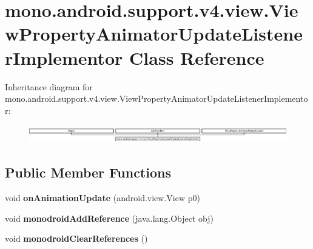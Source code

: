 \hypertarget{classmono_1_1android_1_1support_1_1v4_1_1view_1_1_view_property_animator_update_listener_implementor}{}\section{mono.\+android.\+support.\+v4.\+view.\+View\+Property\+Animator\+Update\+Listener\+Implementor Class Reference}
\label{classmono_1_1android_1_1support_1_1v4_1_1view_1_1_view_property_animator_update_listener_implementor}
Inheritance diagram for mono.\+android.\+support.\+v4.\+view.\+View\+Property\+Animator\+Update\+Listener\+Implementor\+:\begin{figure}[H]
\begin{center}
\leavevmode
\includegraphics[height=0.789288cm]{classmono_1_1android_1_1support_1_1v4_1_1view_1_1_view_property_animator_update_listener_implementor}
\end{center}
\end{figure}
\subsection*{Public Member Functions}
\begin{DoxyCompactItemize}
\item 
\mbox{\label{classmono_1_1android_1_1support_1_1v4_1_1view_1_1_view_property_animator_update_listener_implementor_a4d255e7a411646970a62e3fda262fc90}} 
void {\bfseries on\+Animation\+Update} (android.\+view.\+View p0)
\item 
\mbox{\label{classmono_1_1android_1_1support_1_1v4_1_1view_1_1_view_property_animator_update_listener_implementor_aab23a713316535ff467814de0a1d96b1}} 
void {\bfseries monodroid\+Add\+Reference} (java.\+lang.\+Object obj)
\item 
\mbox{\label{classmono_1_1android_1_1support_1_1v4_1_1view_1_1_view_property_animator_update_listener_implementor_a0279030b5e11e7f78669ad7a2a033d8b}} 
void {\bfseries monodroid\+Clear\+References} ()
\end{DoxyCompactItemize}
